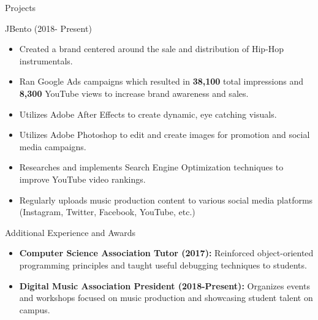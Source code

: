 \documentclass[]{johnsoncv}
\begin{document}
	\begin{cvsection}{Projects}
		\begin{cvsubsection}{JBento (2018- Present)}{}{}
			\begin{itemize}
				\item Created a brand centered around the sale and distribution of Hip-Hop instrumentals.
				\item Ran Google Ads campaigns which resulted in \textbf{38,100} total impressions and \textbf{8,300} YouTube views to increase brand awareness and sales.
				\item Utilizes Adobe After Effects to create dynamic, eye catching visuals.
				\item Utilizes Adobe Photoshop to edit and create images for promotion and social media campaigns.
				\item Researches and implements Search Engine Optimization techniques to improve YouTube video rankings.
				\item Regularly uploads music production content to various social media platforms (Instagram, Twitter, Facebook, YouTube, etc.)
			\end{itemize}
	\end{cvsubsection}

	\end{cvsection}
	
	\begin{cvsection}{Additional Experience and Awards}
		\begin{cvsubsection}{}{}{}	
			\begin{itemize}
				\item \textbf{Computer Science Association Tutor (2017):} Reinforced object-oriented programming principles and taught useful debugging techniques to students.
				\item \textbf{Digital Music Association President (2018-Present):} Organizes events and workshops focused on music production and showcasing student talent on campus.
			\end{itemize}
		\end{cvsubsection}
	\end{cvsection}
\end{document}
